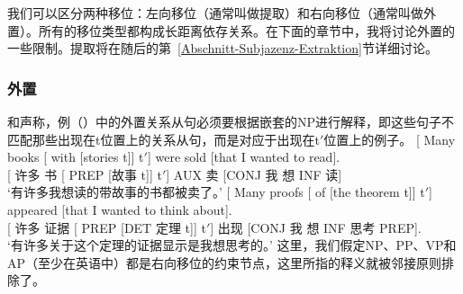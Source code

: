 我们可以区分两种移位：左向移位（通常叫做提取）和右向移位（通常叫做外置）。所有的移位类型都构成长距离依存关系。在下面的章节中，我将讨论外置的一些限制。提取将在随后的第~\ref{Abschnitt-Subjazenz-Extraktion}节详细讨论。

\subsubsection{外置}

\mbox{}\citet{Baltin81a}和\citet[]{Chomsky86b}声称，例（）中的外置关系从句必须要根据嵌套的NP进行解释，即这些句子不匹配那些出现在t位置上的关系从句，而是对应于出现在t$'$位置上的例子。
\eal
\label{ex-chomsky-sub}
\ex 
\gll {}[ Many books [ with [stories t]] t$'$]  were sold [that I wanted to read].\\
{}[ 许多 书 [ PREP [故事 t]] t$'$]  AUX 卖 [CONJ 我 想 INF 读]\\
\glt `有许多我想读的带故事的书都被卖了。'
\ex
\gll {}[ Many proofs [ of [the theorem t]] t$'$] appeared [that I wanted to think about].\\
    {}[ 许多 证据 [ PREP [DET 定理 t]] t$'$] 出现 [CONJ 我 想 INF 思考 PREP].\\
\glt `有许多关于这个定理的证据显示是我想思考的。'    
\zl
这里，我们假定NP、PP、VP和AP（至少在英语中）都是右向移位的约束节点，这里所指的释义就被邻接原则排除了\citep[]{Baltin81a}。

